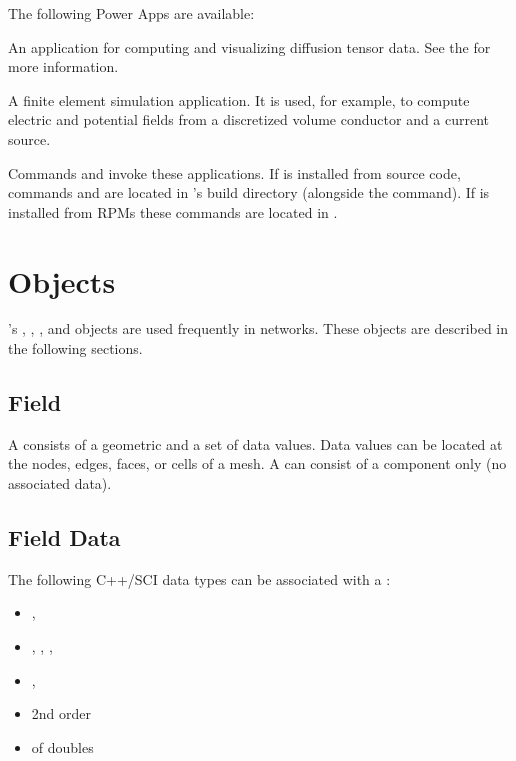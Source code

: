 The following Power Apps are available:

\begin{description}
    An application for computing and visualizing
  diffusion tensor data.  See the 
  for more information.
  
    A finite element simulation application. It is
  used, for example, to compute electric and potential fields from a
  discretized volume conductor and a current source.
\end{description}

Commands  and  invoke these
applications.  If \sr{} is installed from source code, commands
 and  are located in \sr{}'s build
directory (alongside the  command).  If \sr{} is
installed from RPMs these commands are located in
.

\section{\sr{} Objects}
\label{sec:sr-objects}

\sr{}'s , , , and
 objects are used frequently in networks.  These
objects are described in the following sections.

\subsection{Field}

A \sr{}  consists of a geometric  and a
set of data values.  Data values can be located at the nodes, edges,
faces, or cells of a mesh.  A  can consist of a
 component only (no associated data).

\subsection{Field Data}

The following C++/SCI data types can be associated with a :

\begin{itemize}
\item {}, 
\item {}, , , 
\item {}, 
\item 2nd order 
\item {} of doubles
\end{itemize}

